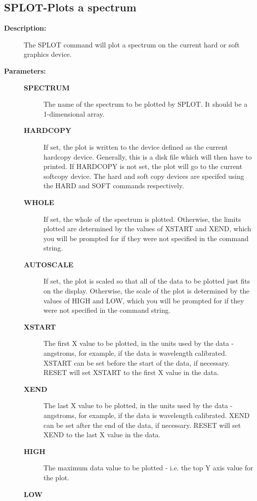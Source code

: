 \subsection{SPLOT-\label{SPLOT}Plots a spectrum}
\begin{description}

\item [\textbf{Description:}]
 The SPLOT command will plot a spectrum on the current
 hard or soft graphics device.

\item [\textbf{Parameters:}]
\begin{description}
\item [\textbf{SPECTRUM}]
 The name of the spectrum to be plotted by SPLOT.
 It should be a 1-dimensional array.
\item [\textbf{HARDCOPY}]
 If set, the plot is written to the device defined
 as the current hardcopy device.  Generally, this
 is a disk file which will then have to printed.  If
 HARDCOPY is not set, the plot will go to the current
 softcopy device.  The hard and soft copy devices are
 specifed using the HARD and SOFT commands respectively.
\item [\textbf{WHOLE}]
 If set, the whole of the spectrum is plotted.
 Otherwise, the limits plotted are determined by the values of
 XSTART and XEND, which you will be prompted for if they were
 not specified in the command string.
\item [\textbf{AUTOSCALE}]
 If set, the plot is scaled so that all of the data to be
 plotted just fits on the display.  Otherwise, the scale of
 the plot is determined by the values of HIGH and LOW, which
 you will be prompted for if they were not specified in the
 command string.
\item [\textbf{XSTART}]
 The first X value to be plotted, in the
 units used by the data - angstroms, for example, if the data
 is wavelength calibrated.  XSTART can be set before the start
 of the data, if necessary.  RESET will set XSTART to the first
 X value in the data.
\item [\textbf{XEND}]
 The last X value to be plotted, in the units
 used by the data - angstroms, for example, if the data
 is wavelength calibrated.  XEND can be set after the end
 of the data, if necessary.  RESET will set XEND to the last
 X value in the data.
\item [\textbf{HIGH}]
 The maximum data value to be plotted - i.e. the top
 Y axis value for the plot.
\item [\textbf{LOW}]

\end{description}
\end{description}
